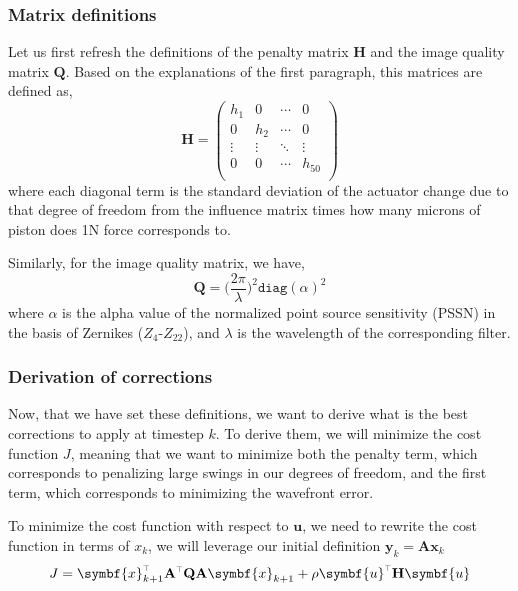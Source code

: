 \documentclass[SE,authoryear,toc]{lsstdoc}
\renewcommand{\v}[1]{\mathbf{#1}}
\newcommand{\tr}{\scalebox{0.6}{$\top$}}
\begin{document}
\subsubsection*{Matrix definitions}
Let us first refresh the definitions of the penalty matrix $\v{H}$ and the image quality matrix $\v{Q}$. Based on the explanations of the first paragraph, this matrices are defined as, 
\begin{equation}
    \v{H} = \left(
  \begin{array}{cccc}
    h_1 &   0     & \cdots & 0 \\
    0 &   h_2     & \cdots & 0 \\
    \vdots &   \vdots    & \ddots & \vdots \\
    0 &   0     & \cdots & h_{50}  \\
  \end{array}
\right)
\end{equation}
where each diagonal term is the standard deviation of the actuator change due to that degree of freedom from the influence matrix times how many microns of piston does 1N force corresponds to.

Similarly, for the image quality matrix, we have,
\begin{equation}
    \v{Q} = \Big(\frac{2\pi}{\lambda}\Big) ^2 \texttt{diag}(\alpha)^2
\end{equation}
where $\alpha$ is the alpha value of the normalized point source sensitivity (PSSN) in the basis of Zernikes ($Z_4$-$Z_{22}$), and $\lambda$ is the wavelength of the corresponding filter.

\subsubsection*{Derivation of corrections}
Now, that we have set these definitions, we want to derive what is the best corrections to apply at timestep $k$. To derive them, we will minimize the cost function $J$, meaning that we want to minimize both the penalty term, which corresponds to penalizing large swings in our degrees of freedom, and the first term, which corresponds to minimizing the wavefront error.

To minimize the cost function with respect to $\symbf{u}$, we need to rewrite the cost function in terms of $x_k$, we will leverage our initial definition $\symbf{y}_k = \v{A} \symbf{x}_k$
\begin{equation}
     J = \symbf{x}_{k+1}^{\tr}\v{A}^{\tr}\v{Q}\v{A}\symbf{x}_{k+1} + \rho \symbf{u}^{\tr}\v{H}\symbf{u}
\end{equation}
\end{document}
